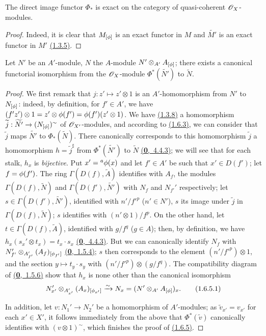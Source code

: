 \begin{cor}[1.6.4]
\label{cor-1.1.6.4}
The direct image functor $\Phi_*$ is exact on the category of quasi-coherent $\mathscr{O}_X$-modules.
\end{cor}

\begin{proof}
\label{proof-cor-1.1.6.4}
Indeed, it is clear that $M_{[\phi]}$ is an exact functor in $M$ and $\widetilde{M'}$ is an
exact functor in $M'$ \hyperref[prop-1.1.3.5]{(1.3.5)}.
\end{proof}

\begin{prop}[1.6.5]
\label{prop-1.1.6.5}
Let $N'$ be an $A'$-module, $N$ the $A$-module $N'\otimes_{A'}A_{[\phi]}$; there exists a
canonical functorial isomorphism from the $\mathscr{O}_X$-module $\Phi^*(\widetilde{N'})$ to
$\widetilde{N}$.
\end{prop}

\begin{proof}
\label{proof-prop-1.1.6.5}
We first remark that $j:z'\mapsto z'\otimes 1$ is an $A'$-homomorphism from $N'$ to
$N_{[\phi]}$: indeed, by definition, for $f'\in A'$, we have
$(f' z')\otimes 1=z'\otimes\phi(f')=\phi(f')(z'\otimes 1)$. We have \hyperref[cor-1.1.3.8]{(1.3.8)} a
homomorphism $\widetilde{j}:\widetilde{N'}\to(N_{[\phi]})^\sim$ of $\mathscr{O}_{X'}$-modules, and
according to \hyperref[prop-1.1.6.3]{(1.6.3)}, we can consider that $\widetilde{j}$ maps $\widetilde{N'}$
to $\Phi_*(\widetilde{N})$. There canonically corresponds to this homomorphism
$\widetilde{j}$ a homomorphism $h=\widetilde{j}^\sharp$ from $\Phi^*(\widetilde{N'})$ to
$\widetilde{N}$ \hyperref[env-0.4.4.3]{(\textbf{0},~4.4.3)}; we will see that for each stalk, $h_x$ is {\em bijective}.
Put $x'={}^a\phi(x)$ and let $f'\in A'$ be such that $x'\in D(f')$; let $f=\phi(f')$. The
ring $\Gamma(D(f),\widetilde{A})$ identifies with $A_f$, the modules
$\Gamma(D(f),\widetilde{N})$ and $\Gamma(D(f'),\widetilde{N'})$ with $N_f$ and $N_{f'}'$
respectively; let $s\in\Gamma(D(f'),\widetilde{N'})$, identified with $n'/{f'}^p$
($n'\in N'$), $s$ its image under $\widetilde{j}$ in $\Gamma(D(f),\widetilde{N})$; $s$
identifies with $(n'\otimes 1)/f^p$. On the other hand, let $t\in\Gamma(D(f),\widetilde{A})$,
identified with $g/f^q$ ($g\in A$); then, by definition, we have
$h_x(s_x'\otimes t_x)=t_x\cdot s_x$ \hyperref[env-0.4.4.3]{(\textbf{0},~4.4.3)}. But we can canonically identify $N_f$
with $N_{f'}'\otimes_{A_{f'}'}(A_f)_{[\phi_{f'}]}$ \hyperref[env-0.1.5.4]{(\textbf{0},~1.5.4)}; $s$ then corresponds
to the element $(n'/{f'}^p)\otimes 1$, and the section $y\mapsto t_y\cdot s_y$ with
$(n'/{f'}^p)\otimes(g/f^q)$. The compatibility diagram of \hyperref[env-0.1.5.6]{(\textbf{0},~1.5.6)} show that $h_x$
is none other than the canonical isomorphism
\[
  N_{x'}'\otimes_{A_{x'}'}(A_x)_{[\phi_{x'}]}\xrightarrow{\sim} N_x=(N'\otimes_{A'}A_{[\phi]})_x.
  \tag{1.6.5.1}
\]

In addition, let $v:N_1'\to N_2'$ be a homomorphism of $A'$-modules; as
$\widetilde{v}_{x'}=v_{x'}$ for each $x'\in X'$, it follows immediately from the above that
$\Phi^*(\widetilde{v})$ canonically identifies with $(v\otimes 1)^\sim$, which finishes the
proof of \hyperref[prop-1.1.6.5]{(1.6.5)}.
\end{proof}

